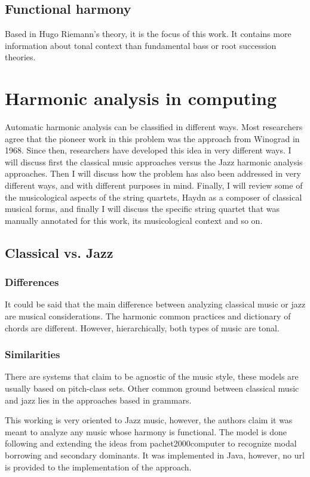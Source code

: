   \subsection{Functional harmony}
  Based in Hugo Riemann's theory, it is the focus of this work. It contains more information about tonal context than fundamental bass or root succession theories.
\section{Harmonic analysis in computing}
  Automatic harmonic analysis can be classified in different ways. Most researchers agree that the pioneer work in this problem was the approach from Winograd in 1968. Since then, researchers have developed this idea in very different ways. I will discuss first the classical music approaches versus the Jazz harmonic analysis approaches. Then I will discuss how the problem has also been addressed in very different ways, and with different purposes in mind. Finally, I will review some of the musicological aspects of the string quartets, Haydn as a composer of classical musical forms, and finally I will discuss the specific string quartet that was manually annotated for this work, its musicological context and so on.
  \subsection{Classical vs. Jazz}
    \subsubsection{Differences}
    It could be said that the main difference between analyzing classical music or jazz are musical considerations. The harmonic common practices and dictionary of chords are different. However, hierarchically, both types of music are tonal.
    \subsubsection{Similarities}
    There are systems that claim to be agnostic of the music style, these models are usually based on pitch-class sets. Other common ground between classical music and jazz lies in the approaches based in grammars.

    This working is very oriented to Jazz music, however, the authors claim it was meant to analyze any music whose harmony is functional. The model is done following and extending the ideas from pachet2000computer to recognize modal borrowing and secondary dominants. It was implemented in Java, however, no url is provided to the implementation of the approach.
